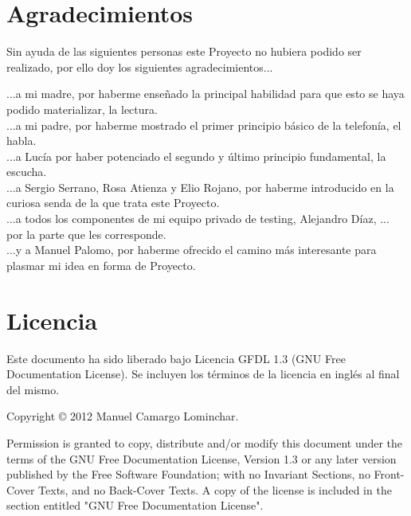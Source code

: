 
\section*{Agradecimientos}

Sin ayuda de las siguientes personas este Proyecto no hubiera podido ser realizado, por ello doy los siguientes agradecimientos...

...a mi madre, por haberme enseñado la principal habilidad para que esto se haya podido materializar, la lectura.\\
...a mi padre, por haberme mostrado el primer principio básico de la telefonía, el habla.\\
...a Lucía por haber potenciado el segundo y último principio fundamental, la escucha.\\
...a Sergio Serrano, Rosa Atienza y Elio Rojano, por haberme introducido en la curiosa senda de la que trata este Proyecto.\\
...a todos los componentes de mi equipo privado de testing, Alejandro Díaz, ... por la parte que les corresponde.\\
...y a Manuel Palomo, por haberme ofrecido el camino más interesante para plasmar mi idea en forma de Proyecto.\\

\cleardoublepage

\section*{Licencia}

Este documento ha sido liberado bajo Licencia GFDL 1.3 (GNU Free
Documentation License). Se incluyen los términos de la licencia en
inglés al final del mismo.

Copyright © 2012 Manuel Camargo Lominchar.

Permission is granted to copy, distribute and/or modify this document under the
terms of the GNU Free Documentation License, Version 1.3 or any later version
published by the Free Software Foundation; with no Invariant Sections, no
Front-Cover Texts, and no Back-Cover Texts. A copy of the license is included in
the section entitled "GNU Free Documentation License".

